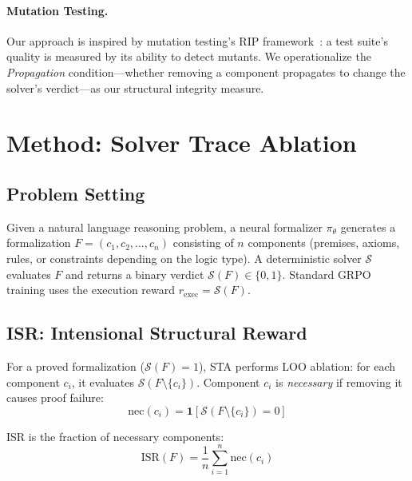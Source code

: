 \documentclass[11pt,twocolumn]{article}
\newcommand{\isr}{\textsc{ISR}}
\newcommand{\sta}{\textsc{STA}}
\newcommand{\grpo}{\textsc{GRPO}}
\begin{document}
\paragraph{Mutation Testing.}
Our approach is inspired by mutation testing's RIP framework~\citep{demillo1978hints,jia2011analysis}: a test suite's quality is measured by its ability to detect mutants.
We operationalize the \emph{Propagation} condition---whether removing a component propagates to change the solver's verdict---as our structural integrity measure.

\section{Method: Solver Trace Ablation}
\label{sec:method}

\subsection{Problem Setting}

Given a natural language reasoning problem, a neural formalizer $\pi_\theta$ generates a formalization $F = (c_1, c_2, \ldots, c_n)$ consisting of $n$ components (premises, axioms, rules, or constraints depending on the logic type).
A deterministic solver $\mathcal{S}$ evaluates $F$ and returns a binary verdict $\mathcal{S}(F) \in \{0, 1\}$.
Standard \grpo{} training uses the execution reward $r_{\text{exec}} = \mathcal{S}(F)$.

\subsection{ISR: Intensional Structural Reward}

For a proved formalization ($\mathcal{S}(F) = 1$), \sta{} performs LOO ablation: for each component $c_i$, it evaluates $\mathcal{S}(F \setminus \{c_i\})$.
Component $c_i$ is \emph{necessary} if removing it causes proof failure:
\begin{equation}
    \text{nec}(c_i) = \mathbf{1}[\mathcal{S}(F \setminus \{c_i\}) = 0]
\end{equation}

\isr{} is the fraction of necessary components:
\begin{equation}
    \text{ISR}(F) = \frac{1}{n} \sum_{i=1}^{n} \text{nec}(c_i)
\end{equation}
\end{document}
